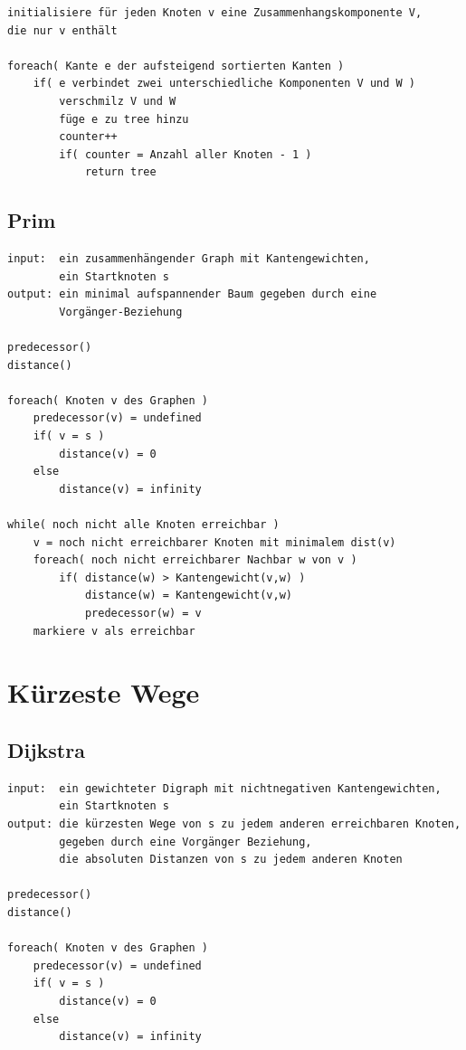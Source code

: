 \documentclass[10pt,a4paper,landscape]{article}
\begin{document}
\begin{multicols*}{2}
\begin{verbatim}
initialisiere für jeden Knoten v eine Zusammenhangskomponente V, 
die nur v enthält

foreach( Kante e der aufsteigend sortierten Kanten )
    if( e verbindet zwei unterschiedliche Komponenten V und W )
        verschmilz V und W
        füge e zu tree hinzu
        counter++
        if( counter = Anzahl aller Knoten - 1 )
            return tree
    \end{verbatim}
\normalsize

    \subsection{ Prim }
    \small
\begin{verbatim}
input:  ein zusammenhängender Graph mit Kantengewichten, 
        ein Startknoten s
output: ein minimal aufspannender Baum gegeben durch eine 
        Vorgänger-Beziehung

predecessor()
distance()

foreach( Knoten v des Graphen )
    predecessor(v) = undefined
    if( v = s )
        distance(v) = 0
    else
        distance(v) = infinity

while( noch nicht alle Knoten erreichbar )
    v = noch nicht erreichbarer Knoten mit minimalem dist(v)
    foreach( noch nicht erreichbarer Nachbar w von v )
        if( distance(w) > Kantengewicht(v,w) )
            distance(w) = Kantengewicht(v,w)
            predecessor(w) = v
    markiere v als erreichbar
    \end{verbatim}
\normalsize


\section{ Kürzeste Wege }
    \subsection{ Dijkstra }
    \small
\begin{verbatim}
input:  ein gewichteter Digraph mit nichtnegativen Kantengewichten,
        ein Startknoten s
output: die kürzesten Wege von s zu jedem anderen erreichbaren Knoten, 
        gegeben durch eine Vorgänger Beziehung,
        die absoluten Distanzen von s zu jedem anderen Knoten

predecessor()
distance()

foreach( Knoten v des Graphen )
    predecessor(v) = undefined
    if( v = s )
        distance(v) = 0
    else
        distance(v) = infinity


\end{verbatim}
\end{multicols*}
\end{document}
